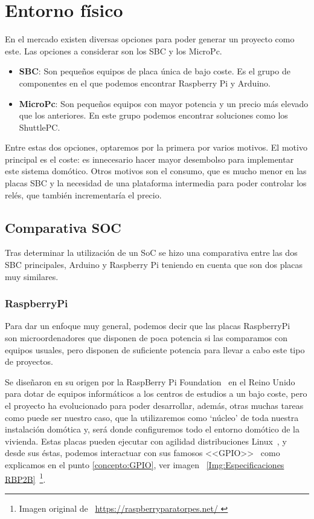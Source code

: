 \section{Entorno físico}

En el mercado existen diversas opciones para poder generar un proyecto como este. Las opciones a considerar son los SBC y los MicroPc.
\begin{itemize}
    \item \textbf{SBC}: Son pequeños equipos de placa única de bajo coste. Es el grupo de componentes en el que podemos encontrar Raspberry Pi y Arduino.
    \item \textbf{MicroPc}: Son pequeños equipos con mayor potencia y un precio más elevado que los anteriores. En este grupo podemos encontrar soluciones como los ShuttlePC.
\end{itemize}

Entre estas dos opciones, optaremos por la primera por varios motivos. El motivo principal es el coste: es innecesario hacer mayor desembolso para implementar este sistema domótico. Otros motivos son el consumo, que es mucho menor en las placas SBC y la necesidad de una plataforma intermedia para poder controlar los relés, que también incrementaría el precio.

\subsection{Comparativa SOC}
Tras determinar la utilización de un SoC se hizo una comparativa entre las dos SBC principales, Arduino y Raspberry Pi teniendo en cuenta que son dos placas muy similares.

\subsubsection{RaspberryPi}\label{4:RaspberryPi}
Para dar un enfoque muy general, podemos decir que las placas RaspberryPi~\cite{misc:RbPWeb} son microordenadores que disponen de poca potencia si las comparamos con equipos usuales, pero disponen de suficiente potencia para llevar a cabo este tipo de proyectos.

Se diseñaron en su origen por la RaspBerry Pi Foundation~\cite{misc:RbPWeb} en el Reino Unido para dotar de equipos informáticos a los centros de estudios a un bajo coste, pero el proyecto ha evolucionado para poder desarrollar, además, otras muchas tareas como puede ser nuestro caso, que la utilizaremos como ‘núcleo’ de toda nuestra instalación domótica y, será donde configuremos todo el entorno domótico de la vivienda.
Estas placas pueden ejecutar con agilidad distribuciones Linux~\cite{misc:Linux}, y desde sus éstas, podemos interactuar con sus famosos <<GPIO>>~\cite{misc:descubrearduino} como explicamos en el punto \ref{concepto:GPIO}, ver imagen ~\ref{Img:Especificaciones RBP2B}~\footnote{Imagen original de ~\url{https://raspberryparatorpes.net/ }}.

